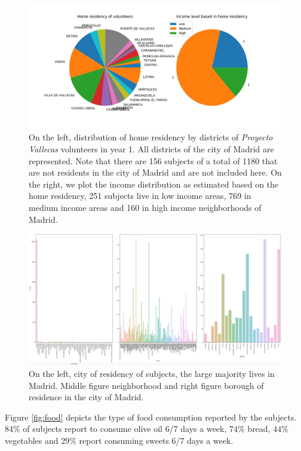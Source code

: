 \documentclass[11pt]{article}
\theoremstyle{definition}
\theoremstyle{remark}
\begin{document}
\begin{figure}[H]
        \centering
        \includegraphics[keepaspectratio, width=\linewidth]{figures/incomeresidency}
        \caption{On the left, distribution of home residency by districts of \emph{Proyecto Vallecas} volunteers in year 1. All districts of the city of Madrid are represented. Note that there are 156 subjects of a total of 1180 that are not residents in the city of Madrid and are not included here. On the right, we plot the income distribution as estimated based on the home residency, 251 subjects live in low income areas, 769 in medium income areas and 160 in high income neighborhoods of Madrid.
        } \label{fig:incomeresidency}
\end{figure}

\begin{figure}[]
        \centering
        \includegraphics[height=\textheight, width=\textwidth]{figures/resid_detail}
        \caption{On the left, city of residency of subjects, the large majority lives in Madrid. Middle figure neighborhood and right figure borough of residence in the city of Madrid. 
        } \label{fig:incomeresidency}
\end{figure}

Figure \ref{fig:food} depicts the type of food consumption reported by the subjects. $84\%$ of subjects report to consume olive oil 6/7 days a week, $74\%$ bread, $44\%$ vegetables and $29\%$ report consuming sweets 6/7 days a week.
\end{document}
